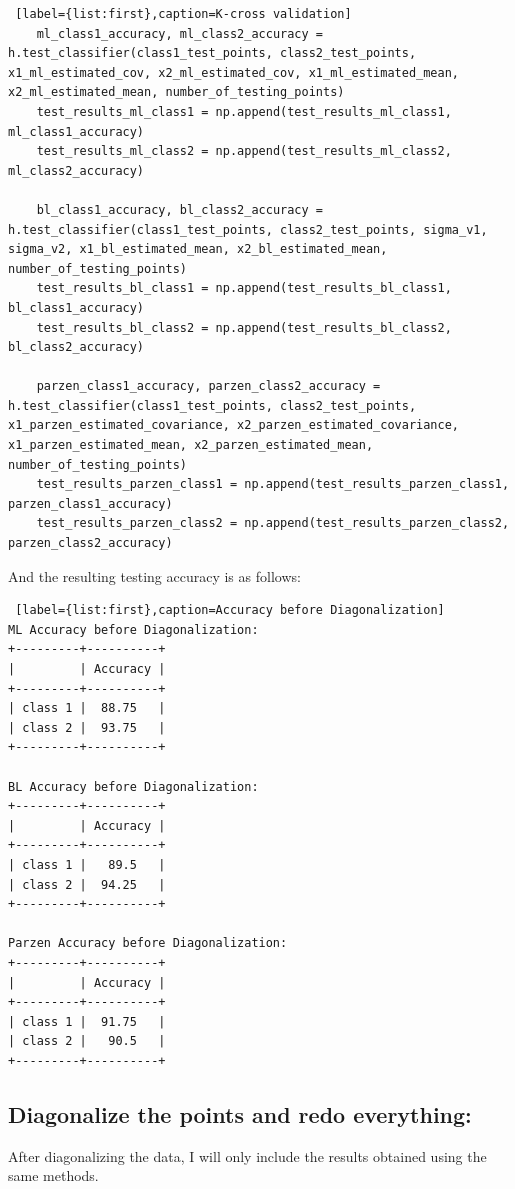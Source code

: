 \documentclass[11pt, oneside]{article}   	%
\begin{document}
\begin{lstlisting} [label={list:first},caption=K-cross validation]
    ml_class1_accuracy, ml_class2_accuracy = h.test_classifier(class1_test_points, class2_test_points, x1_ml_estimated_cov, x2_ml_estimated_cov, x1_ml_estimated_mean, x2_ml_estimated_mean, number_of_testing_points)
    test_results_ml_class1 = np.append(test_results_ml_class1, ml_class1_accuracy)
    test_results_ml_class2 = np.append(test_results_ml_class2, ml_class2_accuracy)

    bl_class1_accuracy, bl_class2_accuracy = h.test_classifier(class1_test_points, class2_test_points, sigma_v1, sigma_v2, x1_bl_estimated_mean, x2_bl_estimated_mean, number_of_testing_points)
    test_results_bl_class1 = np.append(test_results_bl_class1, bl_class1_accuracy)
    test_results_bl_class2 = np.append(test_results_bl_class2, bl_class2_accuracy)

    parzen_class1_accuracy, parzen_class2_accuracy = h.test_classifier(class1_test_points, class2_test_points, x1_parzen_estimated_covariance, x2_parzen_estimated_covariance, x1_parzen_estimated_mean, x2_parzen_estimated_mean, number_of_testing_points)
    test_results_parzen_class1 = np.append(test_results_parzen_class1, parzen_class1_accuracy)
    test_results_parzen_class2 = np.append(test_results_parzen_class2, parzen_class2_accuracy)
\end{lstlisting}

And the resulting testing accuracy is as follows:
\begin{lstlisting} [label={list:first},caption=Accuracy before Diagonalization]
ML Accuracy before Diagonalization:
+---------+----------+
|         | Accuracy |
+---------+----------+
| class 1 |  88.75   |
| class 2 |  93.75   |
+---------+----------+

BL Accuracy before Diagonalization:
+---------+----------+
|         | Accuracy |
+---------+----------+
| class 1 |   89.5   |
| class 2 |  94.25   |
+---------+----------+

Parzen Accuracy before Diagonalization:
+---------+----------+
|         | Accuracy |
+---------+----------+
| class 1 |  91.75   |
| class 2 |   90.5   |
+---------+----------+

\end{lstlisting}

\break
\subsection{Diagonalize the points and redo everything:}
After diagonalizing the data, I will only include the results obtained using the same methods.
\end{document}
